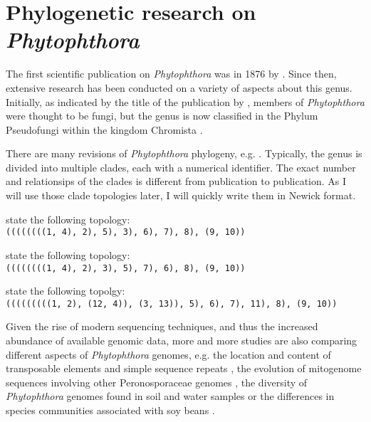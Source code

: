 \section{Phylogenetic research on \textit{Phytophthora}} 

The first scientific publication on \textit{Phytophthora} was in 1876 by
\cite{debaryResearchesNaturePotatofungus1876,kroonGenusPhytophthoraAnno2012}.
Since then, extensive research has been conducted on a variety of aspects about
this genus. Initially, as indicated by the title of the publication by
, members of
\textit{Phytophthora} were thought to be fungi, but the genus is now classified
in the Phylum Pseudofungi within the kingdom Chromista
\cite{hardhamPhytophthoraCinnamomi2018,beakesEvolutionaryPhylogenyOomycete2012}.

There are many revisions of \textit{Phytophthora} phylogeny, e.g.
\cite{kroonGenusPhytophthoraAnno2012,yangExpandedPhylogenyGenus2017,abadPhytophthoraTaxonomicPhylogenetic2023a}.
Typically, the genus is divided into multiple clades, each with a numerical
identifier. The exact number and relationsips of the clades is different from
publication to publication. As I will use those clade topologies later, I will
quickly write them in Newick format.

 state the following topology:\\
\texttt{((((((((1, 4), 2), 5), 3), 6), 7), 8), (9, 10))}\cite{kroonGenusPhytophthoraAnno2012}

 state the following topology:\\
\texttt{((((((((1, 4), 2), 3), 5), 7), 6), 8), (9, 10))}\cite{yangExpandedPhylogenyGenus2017}

 state the following topolgy:\\
\texttt{(((((((((1, 2), (12, 4)), (3, 13)), 5), 6), 7), 11), 8), (9, 10))}\cite{abadPhytophthoraTaxonomicPhylogenetic2023a}

Given the rise of modern sequencing techniques, and thus the increased abundance
of available genomic data, more and more studies are also comparing different
aspects of \textit{Phytophthora} genomes, e.g. the location and content of
transposable elements and simple sequence repeats
\cite{mandalComparativeGenomeAnalysis2022}, the evolution of mitogenome
sequences involving other Peronosporaceae genomes
\cite{winkworthComparativeAnalysesComplete2022}, the diversity of
\textit{Phytophthora} genomes found in soil and water samples
\cite{catalaUseGenusSpecificAmplicon2015} or the differences in species
communities associated with soy beans
\cite{navarroComparisonSpeciesCommunities2021}.

